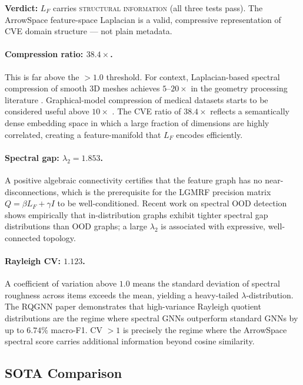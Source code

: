 \documentclass[12pt,a4paper]{article}
\theoremstyle{plain}
\theoremstyle{definition}
\theoremstyle{remark}
\newcommand{\1}{\mathbf{1}}
\begin{document}
	\noindent\textbf{Verdict:} $L_F$ carries \textsc{structural information}
	(all three tests pass).
	The ArrowSpace feature-space Laplacian is a valid, compressive
	representation of CVE domain structure --- not plain metadata.
	
	\paragraph{Compression ratio: $38.4\times$.}
	This is far above the $> 1.0$ threshold.
	For context, Laplacian-based spectral compression of smooth 3D meshes
	achieves $5$--$20\times$ in the geometry processing literature
	\citep{ShumanDSPGraphs}.
	Graphical-model compression of medical datasets starts to be considered
	useful above $10\times$ \citep{DongLaplacianGMRF}.
	The CVE ratio of $38.4\times$ reflects a semantically dense embedding
	space in which a large fraction of dimensions are highly correlated,
	creating a feature-manifold that $L_F$ encodes efficiently.
	
	\paragraph{Spectral gap: $\lambda_2 = 1.853$.}
	A positive algebraic connectivity certifies that the feature graph has
	no near-disconnections, which is the prerequisite for the LGMRF
	precision matrix $Q = \beta L_F + \gamma I$ to be well-conditioned.
	Recent work on spectral OOD detection \citep{SpecGapGNN} shows
	empirically that in-distribution graphs exhibit tighter spectral gap
	distributions than OOD graphs; a large $\lambda_2$ is associated with
	expressive, well-connected topology.
	
	\paragraph{Rayleigh CV: $1.123$.}
	A coefficient of variation above $1.0$ means the standard deviation of
	spectral roughness across items exceeds the mean, yielding a
	heavy-tailed $\lambda$-distribution.
	The RQGNN paper \citep{RQGNN} demonstrates that high-variance Rayleigh
	quotient distributions are the regime where spectral GNNs outperform
	standard GNNs by up to $6.74\%$ macro-F1.
	CV $> 1$ is precisely the regime where the ArrowSpace spectral
	score carries additional information beyond cosine similarity.
	
	\subsection{SOTA Comparison}
	
\end{document}
